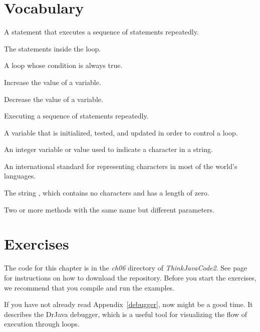 \section{Vocabulary}

\begin{description}

A statement that executes a sequence of statements repeatedly.

The statements inside the loop.

A loop whose condition is always true.

Increase the value of a variable.

Decrease the value of a variable.

Executing a sequence of statements repeatedly.

A variable that is initialized, tested, and updated in order to control a loop.

An integer variable or value used to indicate a character in a string.

An international standard for representing characters in most of the world's languages.

The string , which contains no characters and has a length of zero.

Two or more methods with the same name but different parameters.

\end{description}


\section{Exercises}

The code for this chapter is in the {\it ch06} directory of {\it ThinkJavaCode2}.
See page~\pageref{code} for instructions on how to download the repository.
Before you start the exercises, we recommend that you compile and run the examples.

If you have not already read Appendix~\ref{debugger}, now might be a good time.
It describes the DrJava debugger, which is a useful tool for visualizing the flow of execution through loops.


